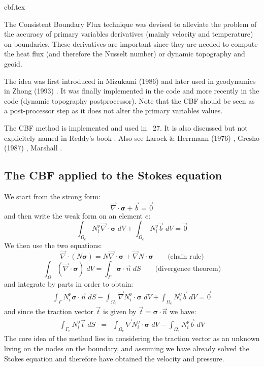 \begin{flushright} {\tiny {\color{gray} cbf.tex}} \end{flushright}

The Consistent Boundary Flux technique was devised to 
alleviate the problem of the accuracy of primary variables 
derivatives (mainly velocity and temperature) on boundaries.
These derivatives are important since they are needed to compute
the heat flux (and therefore the Nusselt number) or 
dynamic topography and geoid. 

The idea was first introduced in Mizukami (1986) \cite{mizu86} and later used 
in geodynamics in Zhong \etal (1993) \cite{zhgh93}. It was finally implemented 
in the \citcoms code \cite{zhmt08,mole97} and more recently
in the \aspect code (dynamic topography postprocessor).
Note that the CBF should be seen as a post-processor step 
as it does not alter the primary variables values.

The CBF method is implemented and used in \stone~27.
It is also discussed but not explicitely named in Reddy's book \cite[p309]{reddybook2}.
Also see Larock \& Herrmann (1976) \cite{lahe76}, Gresho \etal (1987) \cite{grls87}, Marshall \etal \cite{mahz78}.


\subsection{The CBF applied to the Stokes equation}
We start from the strong form:
\begin{equation}
{\vec \nabla}\cdot {\bm \sigma} + {\vec b} = {\vec 0} 
\end{equation}
and then write the weak form on an element $e$:
\begin{equation}
\int_{\Omega_e} N_i^\upnu {\vec \nabla}\cdot {\bm \sigma}\; dV
+ \int_{\Omega_e} N_i^\upnu  {\vec b} \; dV
= \vec 0 
\end{equation}
We then use the two equations: 
\[
\vec \nabla \cdot ( N  \bm \sigma ) = N \vec{\nabla} \cdot \bm \sigma + \vec{\nabla} N \cdot  \bm \sigma  
\qquad \text{(chain rule)}
\]
\[
\int_\Omega (\vec \nabla \cdot {\bm \sigma} )\; dV = \int_\Gamma {\bm \sigma} \cdot \vec{n} \; dS
\qquad \text{(divergence theorem)}
\]
and integrate by parts in order to obtain:
\begin{eqnarray}
\int_\Gamma N_i^\upnu {\bm \sigma}\cdot\vec{n} \; dS - 
\int_{\Omega_e} {\vec \nabla } N_i^\upnu \cdot {\bm \sigma} \; dV 
+ \int_{\Omega_e} N_i^\upnu  {\vec b} \; dV =\vec{0}
\end{eqnarray}
and since the traction vector ${\vec t}$ is given by $\vec{t}={\bm \sigma}\cdot\vec{n}$ we have:
\begin{eqnarray}
\int_{\Gamma_e}  N_i^\upnu {\vec t} \; dS 
&=& \int_{\Omega_e} {\vec \nabla } N_i^\upnu \cdot {\bm \sigma}\; dV 
- \int_{\Omega_e} N_i^\upnu  {\vec b} \; dV   \label{eq:cbf1}
\end{eqnarray}
The core idea of the method lies in considering the traction vector as an unknown 
living on the nodes on the boundary, and assuming we have already solved the Stokes 
equation and therefore have obtained the velocity and pressure.

